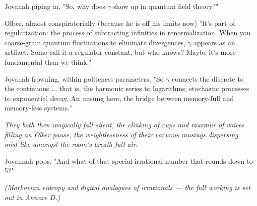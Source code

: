 
Jovanah piping in. "So, why does \(\gamma\) show up in quantum field theory?"

Olber, almost conspiratorially (because he is off his limits now) "It’s part of regularization: the process of subtracting infinities in renormalization. When you coarse-grain quantum fluctuations to eliminate divergences, \(\gamma\) appears as an artifact. Some call it a regulator constant, but who knows? Maybe it’s more fundamental than we think."

Jovanah frowning, within politeness parameters, "So \(\gamma\) connects the discrete to the continuous ... that is, the harmonic series to logarithms, stochastic processes to exponential decay. An unsung hero, the bridge between memory-full and memory-less systems."

\textit{They both then magically fall silent, the clinking of cups and murmur of voices filling an Olber pause, the weightlessness of their vacuous musings dispersing mist-like amongst the room's breath-full air.} 

Jovannah pops. "And what of that special irrational number that rounds down to 5?"

\newpage



\newpage
\textit{(Markovian entropy and digital analogues of irrationals --- the full working is set out in Annexe D.)}

